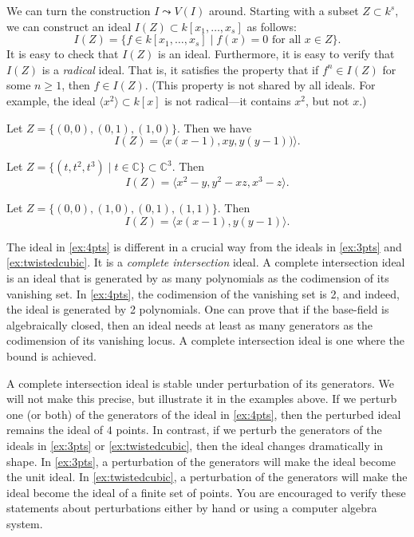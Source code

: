 \documentclass[11pt]{article}
\newcommand{\C}{\mathbb C}
\begin{document}
We can turn the construction $I \leadsto V(I)$ around.
Starting with a subset $Z \subset k^s$, we can construct an ideal $I(Z) \subset k[x_1, \dots, x_s]$ as follows:
\[ I(Z) = \{f \in k[x_1,\dots,x_s] \mid f(x) = 0 \text{ for all $x \in Z$}\}.\]
It is easy to check that $I(Z)$ is an ideal.
Furthermore, it is easy to verify that $I(Z)$ is a \emph{radical} ideal.
That is, it satisfies the property that if $f^n \in I(Z)$ for some $n \geq 1$, then $f \in I(Z)$.
(This property is not shared by all ideals.
For example, the ideal $\langle  x^2 \rangle \subset k[x]$ is not radical---it contains $x^2$, but not $x$.)

\begin{example}
  \label{ex:3pts}
  Let $Z = \{(0,0), (0,1), (1,0)\}$.
  Then we have
  \[ I(Z) = \langle x(x-1), xy, y(y-1)) \rangle.\]
\end{example}
\begin{example}
    \label{ex:twistedcubic}
Let $Z = \{(t, t^2, t^3) \mid t \in \C\} \subset \C^3$.
  Then
  \[ I(Z) = \langle  x^2-y, y^2-xz, x^3-z \rangle.\]
\end{example}
\begin{example}
  \label{ex:4pts}
  Let $Z = \{(0,0), (1,0), (0,1), (1,1)\}$.
  Then
  \[ I(Z) = \langle  x(x-1), y(y-1) \rangle.\]
\end{example}
\begin{remark}
  The ideal in \autoref{ex:4pts} is different in a crucial way from the ideals in \autoref{ex:3pts} and \autoref{ex:twistedcubic}.
  It is a \emph{complete intersection} ideal.
  A complete intersection ideal is an ideal that is generated by as many polynomials as the codimension of its vanishing set.
  In \autoref{ex:4pts}, the codimension of the vanishing set is 2, and indeed, the ideal is generated by 2 polynomials.
  One can prove that if the base-field is algebraically closed, then an ideal needs at least as many generators as the codimension of its vanishing locus.
  A complete intersection ideal is one where the bound is achieved.

  A complete intersection ideal is stable under perturbation of its generators.
  We will not make this precise, but illustrate it in the examples above.
  If we perturb one (or both) of the generators of the ideal in \autoref{ex:4pts}, then the perturbed ideal remains the ideal of $4$ points.
  In contrast, if we perturb the generators of the ideals in \autoref{ex:3pts} or \autoref{ex:twistedcubic}, then the ideal changes dramatically in shape.
  In \autoref{ex:3pts}, a perturbation of the generators will make the ideal become the unit ideal.
  In \autoref{ex:twistedcubic}, a perturbation of the generators will make the ideal become the ideal of a finite set of points.
  You are encouraged to verify these statements about perturbations either by hand or using a computer algebra system.
\end{remark}
\end{document}
